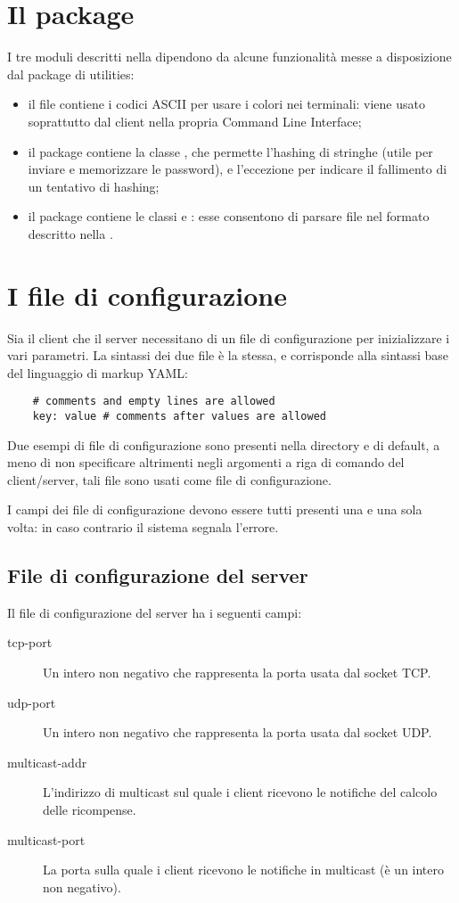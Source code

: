 \documentclass[
    oneside,
    10pt,
    language=italian,
    a4paper,
    article
]{notes}
\begin{document}
\section{Il package }
I tre moduli descritti nella  dipendono da alcune funzionalità
messe a disposizione dal package di utilities:
\begin{itemize}
    \item il file  contiene i codici ASCII
        per usare i colori nei terminali: viene usato soprattutto dal client
        nella propria Command Line Interface;
    \item il package  contiene la classe
        , che permette l'hashing di stringhe (utile per
        inviare e memorizzare le password), e l'eccezione 
         per indicare il fallimento di un tentativo
        di hashing;
    \item il package  contiene le classi
         e : esse consentono di parsare
        file nel formato descritto nella .
\end{itemize}

\section{I file di configurazione} \label{sec:config}
Sia il client che il server necessitano di un file di configurazione per 
inizializzare i vari parametri. La sintassi dei due file è la stessa, e corrisponde
alla sintassi base del linguaggio di markup YAML:
\begin{verbatim}
    # comments and empty lines are allowed
    key: value # comments after values are allowed
\end{verbatim}
Due esempi di file di configurazione sono presenti nella directory 
e di default, a meno di non specificare altrimenti negli argomenti a riga di
comando del client/server, tali file sono usati come file di configurazione.  

I campi dei file di configurazione devono essere tutti presenti una e una sola 
volta: in caso contrario il sistema segnala l'errore.

\subsection{File di configurazione del server}
Il file di configurazione del server ha i seguenti campi:
\begin{description}
    \item[tcp-port] Un intero non negativo che rappresenta la porta usata dal socket TCP. 
    \item[udp-port] Un intero non negativo che rappresenta la porta usata dal socket UDP.
    \item[multicast-addr] L'indirizzo di multicast sul quale i client ricevono
        le notifiche del calcolo delle ricompense.
    \item[multicast-port] La porta sulla quale i client ricevono le notifiche
        in multicast (è un intero non negativo). 
\end{description}
\end{document}
